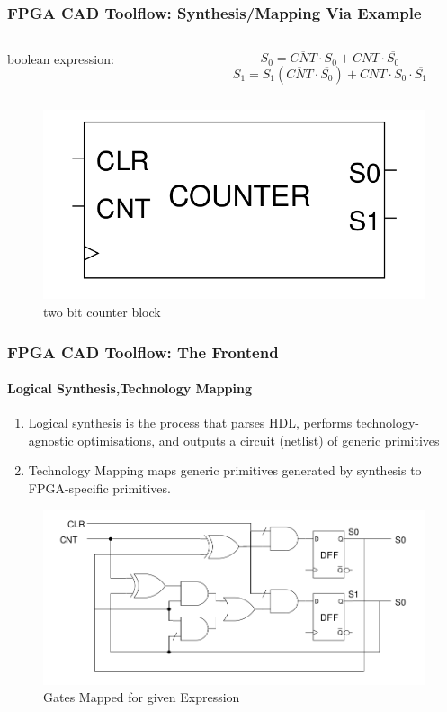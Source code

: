 \documentclass{beamer}
\begin{document}
\begin{frame}[fragile]
  \frametitle{FPGA CAD Toolflow: Synthesis/Mapping Via Example}
  \begin{columns}
   \begin{column}{0.5\textwidth}
     boolean expression:
    \end{column}
   \begin{column}{0.5\textwidth}		
     \[{S}_0 = \overline{CNT}\cdot{S}_0+ CNT \cdot \overline{{S}_0} \]
     \[{S}_1  ={S}_1 (\overline{CNT} \cdot\overline{{S}_0}) + CNT\cdot{S}_0\cdot\overline{{S}_1} \]
   \end{column}
   \end{columns}
   \begin{figure}[h]
       \centering
       \includegraphics[width=0.45\linewidth]{images/basic_block.png} 
       \caption{two bit counter block}
       \label{exa_block}
    \end{figure}
\end{frame}




\begin{frame}[fragile]
    \frametitle{FPGA CAD Toolflow: The Frontend}
    \framesubtitle{Logical Synthesis,Technology Mapping}
    \begin{enumerate}
      \item Logical synthesis is the process that parses HDL, performs
        technology-agnostic optimisations, and outputs a circuit (netlist)
        of generic primitives
      \item Technology Mapping maps generic primitives generated by synthesis to
        FPGA-specific primitives. 
    \end{enumerate}
    \begin{figure}
        \includegraphics[width=0.5\linewidth]{images/netlist_gate.png}
        \caption{Gates Mapped for given Expression}
        \label{exa_mapgate}
    \end{figure}

\end{frame}
\end{document}
